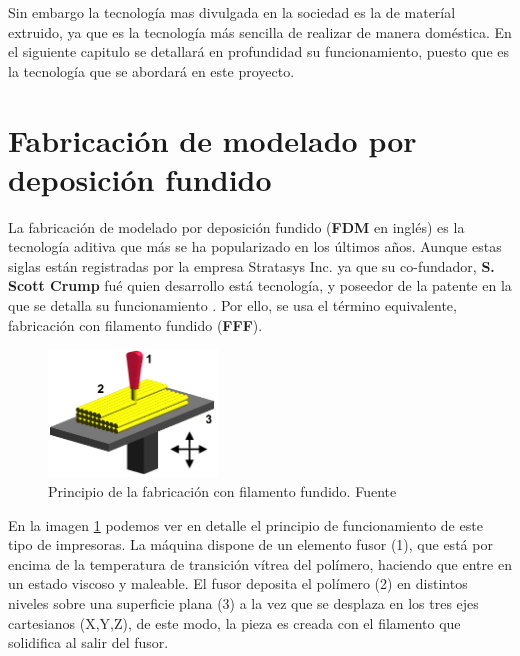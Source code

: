 Sin embargo la tecnología mas divulgada en la sociedad es la de materíal extruido, ya que es la tecnología más sencilla de realizar de manera doméstica. En el siguiente capitulo se detallará en profundidad su funcionamiento, puesto que es la tecnología que se abordará en este proyecto.

\section{Fabricación de modelado por deposición fundido}
La fabricación de modelado por deposición fundido (\textbf{FDM\textregistered} en inglés) es la tecnología aditiva que más se ha popularizado en los últimos años. Aunque estas siglas están registradas por la empresa Stratasys Inc. ya que su co-fundador,  \textbf{S. Scott Crump} fué quien desarrollo está tecnología, y poseedor de la patente en la que se detalla su funcionamiento \cite{crump1992apparatus}. Por ello, se usa el término equivalente, fabricación con filamento fundido (\textbf{FFF}).\\  
    
    \begin{figure}[H]
            \centering
            \includegraphics[width=0.4\textwidth]{images/FDM_by_Zureks.png}
            \caption{Principio de la fabricación con filamento fundido. Fuente \cite{fundamentoFDM}}
            \label{fig:impr_fdm}
    \end{figure}

En la imagen \ref{fig:impr_fdm} podemos ver en detalle el principio de funcionamiento de este tipo de impresoras. La máquina dispone de un elemento fusor (1), que está por encima de la temperatura de transición vítrea del polímero, haciendo que entre en un estado viscoso y maleable. El fusor deposita el polímero (2) en distintos niveles sobre una superficie plana (3) a la vez que se desplaza en los tres ejes cartesianos (X,Y,Z), de este modo, la pieza es creada con el filamento que solidifica al salir del fusor.\\

